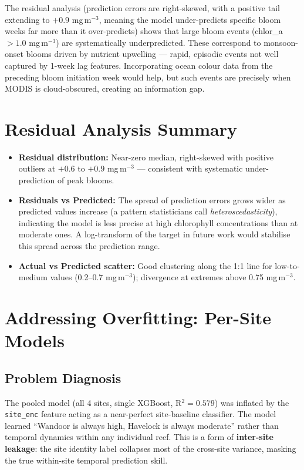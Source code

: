 \documentclass[12pt,a4paper]{report}
\begin{document}
The residual analysis (prediction errors are right-skewed, with a positive tail
extending to $+0.9$ mg\,m$^{-3}$, meaning the model under-predicts specific bloom
weeks far more than it over-predicts) shows that large bloom events
(chlor\_a $> 1.0$ mg\,m$^{-3}$) are systematically underpredicted. These correspond to monsoon-onset blooms driven by
nutrient upwelling — rapid, episodic events not well captured by 1-week lag features.
Incorporating ocean colour data from the preceding bloom initiation week would help,
but such events are precisely when MODIS is cloud-obscured, creating an information gap.

\section{Residual Analysis Summary}

\begin{itemize}[leftmargin=*]
  \item \textbf{Residual distribution:} Near-zero median, right-skewed with positive outliers at $+0.6$ to $+0.9$ mg\,m$^{-3}$ — consistent with systematic under-prediction of peak blooms.
  \item \textbf{Residuals vs Predicted:} The spread of prediction errors grows wider
    as predicted values increase (a pattern statisticians call \textit{heteroscedasticity}),
    indicating the model is less precise at high chlorophyll concentrations than at
    moderate ones. A log-transform of the target in future work would stabilise this
    spread across the prediction range.
  \item \textbf{Actual vs Predicted scatter:} Good clustering along the 1:1 line for low-to-medium values (0.2--0.7 mg\,m$^{-3}$); divergence at extremes above 0.75 mg\,m$^{-3}$.
\end{itemize}

\section{Addressing Overfitting: Per-Site Models}
\label{sec:persite}

\subsection{Problem Diagnosis}

The pooled model (all 4 sites, single XGBoost, R$^2 = 0.579$) was inflated by the
\texttt{site\_enc} feature acting as a near-perfect site-baseline classifier. The model
learned ``Wandoor is always high, Havelock is always moderate'' rather than temporal
dynamics within any individual reef. This is a form of \textbf{inter-site leakage}:
the site identity label collapses most of the cross-site variance, masking the true
within-site temporal prediction skill.
\end{document}
